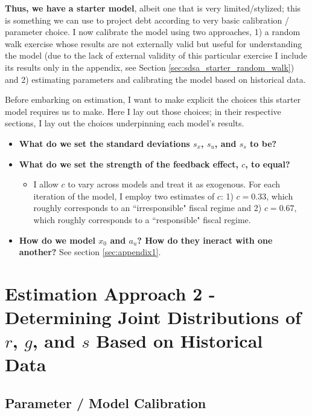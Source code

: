 \documentclass{article}
\begin{document}
\textbf{Thus, we have a starter model}, albeit one that is very limited/stylized; this is something we can use to project debt according to very basic calibration / parameter choice. I now calibrate the model using two approaches, 1) a random walk exercise whose results are not externally valid but useful for understanding the model (due to the lack of external validity of this particular exercise I include its results only in the appendix, see Section \ref{sec:sdsa_starter_random_walk}) and 2) estimating parameters and calibrating the model based on historical data. 

Before embarking on estimation, I want to make explicit the choices this starter model requires us to make. Here I lay out those choices; in their respective sections, I lay out the choices underpinning each model's results.
\begin{itemize}
	\item \textbf{What do we set the standard deviations $s_x$, $s_u$, and $s_s$ to be?}
	\item \textbf{What do we set the strength of the feedback effect, $c$, to equal?}
	\begin{itemize}
		\item I allow $c$ to vary across models and treat it as exogenous. For each iteration of the model, I employ two estimates of $c$: 1) $c = 0.33$, which roughly corresponds to an ``irresponsible" fiscal regime and 2) $c = 0.67$, which roughly corresponds to a ``responsible" fiscal regime.
	\end{itemize}
	\item \textbf{How do we model $x_0$ and $a_u$? How do they ineract with one another?} See section \ref{sec:appendix1}.
\end{itemize}

\section{Estimation Approach 2 - Determining Joint Distributions of $r$, $g$, and $s$ Based on Historical Data}

\subsection{Parameter / Model Calibration}
\end{document}
